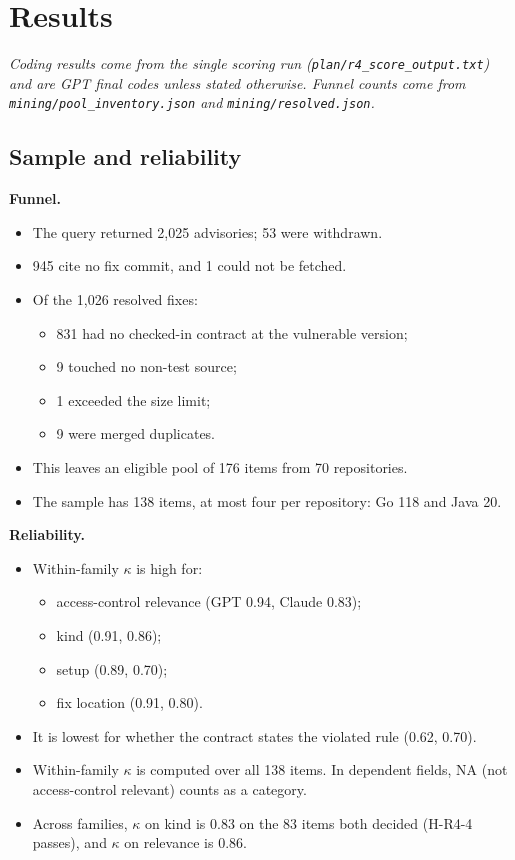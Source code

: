\documentclass[conference]{IEEEtran}
\begin{document}
\section{Results}
\emph{Coding results come from the single scoring run (\texttt{plan/\allowbreak{}r4\_score\_output.txt}) and are GPT final codes unless stated otherwise. Funnel counts come from \texttt{mining/\allowbreak{}pool\_inventory.json} and \texttt{mining/\allowbreak{}resolved.json}.}

\subsection{Sample and reliability}
\textbf{Funnel.}
\begin{itemize}
\item The query returned 2,025 advisories; 53 were withdrawn.
\item 945 cite no fix commit, and 1 could not be fetched.
\item Of the 1,026 resolved fixes:
\begin{itemize}
\item 831 had no checked-in contract at the vulnerable version;
\item 9 touched no non-test source;
\item 1 exceeded the size limit;
\item 9 were merged duplicates.
\end{itemize}
\item This leaves an eligible pool of 176 items from 70 repositories.
\item The sample has 138 items, at most four per repository: Go 118 and Java 20.
\end{itemize}

\textbf{Reliability.}
\begin{itemize}
\item Within-family $\kappa$ is high for:
\begin{itemize}
\item access-control relevance (GPT 0.94, Claude 0.83);
\item kind (0.91, 0.86);
\item setup (0.89, 0.70);
\item fix location (0.91, 0.80).
\end{itemize}
\item It is lowest for whether the contract states the violated rule (0.62, 0.70).
\item Within-family $\kappa$ is computed over all 138 items. In dependent fields, NA (not access-control relevant) counts as a category.
\item Across families, $\kappa$ on kind is 0.83 on the 83 items both decided (H-R4-4 passes), and $\kappa$ on relevance is 0.86.
\end{itemize}
\end{document}
